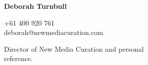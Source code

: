 \documentclass[a4paper,12pt]{article}
\begin{document}
\begin{spacing}{0.95}
\begin{minipage}[t]{45mm}
{		\vspace{-5mm}%
	}%
\end{minipage}%
\hspace{5mm}%
\begin{minipage}[t]{45mm}
	{\small%
		\textbf{\textsf{\color{grey}Deborah Turnbull}}\\
		\vspace{-4mm}\begin{spacing}{0.7}{\footnotesize{\condensed +61 400 920 761\\deborah@newmediacuration.com}}\\\end{spacing}
		\vspace{-1mm}\begin{spacing}{0.9}{\raggedright Director of New Media Curation and personal\\reference.}\end{spacing}%
	\vspace{-5mm}%
	}%
\end{minipage}%
\end{spacing}%
\end{document}
